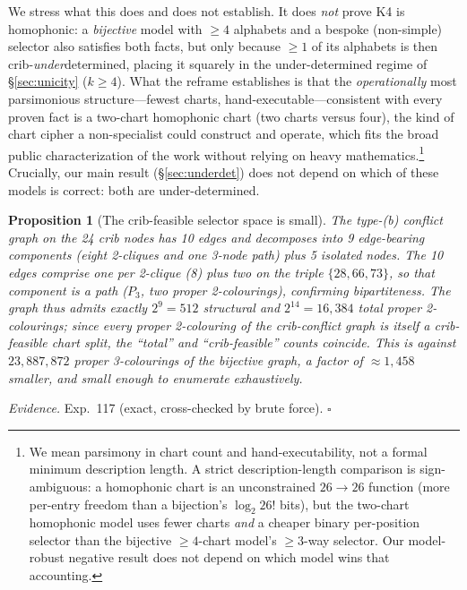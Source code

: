 \documentclass[11pt]{article}
\theoremstyle{plain}
\newtheorem{proposition}{Proposition}
\theoremstyle{definition}
\newcommand{\K}{\textsf{K4}}
\begin{document}
\noindent
We stress what this does and does not establish. It does \emph{not} prove \K{} is
homophonic: a \emph{bijective} model with $\ge4$ alphabets and a bespoke (non-simple)
selector also satisfies both facts, but only because $\ge1$ of its alphabets is then
crib-\emph{under}determined, placing it squarely in the under-determined regime of
\S\ref{sec:unicity} ($k\ge4$). What the reframe establishes is that the
\emph{operationally} most parsimonious structure---fewest charts,
hand-executable---consistent with every proven fact is a two-chart homophonic chart
(two charts versus four), the kind of chart cipher a non-specialist could construct
and operate, which fits the broad public characterization of the work \cite{dunin2020}
without relying on heavy mathematics.\footnote{We mean parsimony in chart count and
hand-executability, not a formal minimum description length. A strict
description-length comparison is sign-ambiguous: a homophonic chart is an
unconstrained $26\to26$ function (more per-entry freedom than a bijection's
$\log_2 26!$ bits), but the two-chart homophonic model uses fewer charts \emph{and} a
cheaper binary per-position selector than the bijective $\ge4$-chart model's
$\ge3$-way selector. Our model-robust negative result does not depend on which model
wins that accounting.} Crucially, our main result (\S\ref{sec:underdet}) does not
depend on which of these models is correct: both are under-determined.

\begin{proposition}[The crib-feasible selector space is small]\label{prop:count}
The type-(b) conflict graph on the 24 crib nodes has 10 edges and decomposes into 9
edge-bearing components (eight 2-cliques and one 3-node path) plus 5 isolated nodes.
The 10 edges comprise one per 2-clique (8) plus two on the triple $\{28,66,73\}$, so
that component is a path ($P_3$, two proper 2-colourings), confirming bipartiteness.
The graph thus admits exactly $2^{9}=512$ structural and $2^{14}=16{,}384$ total
proper 2-colourings; since every proper 2-colouring of the crib-conflict graph is
itself a crib-feasible chart split, the ``total'' and ``crib-feasible'' counts
coincide. This is against $23{,}887{,}872$ proper 3-colourings of the bijective graph,
a factor of $\approx1{,}458$ smaller, and small enough to enumerate exhaustively.
\end{proposition}
\noindent\emph{Evidence.} Exp.~117 (exact, cross-checked by brute force).
\hfill$\square$
\end{document}
